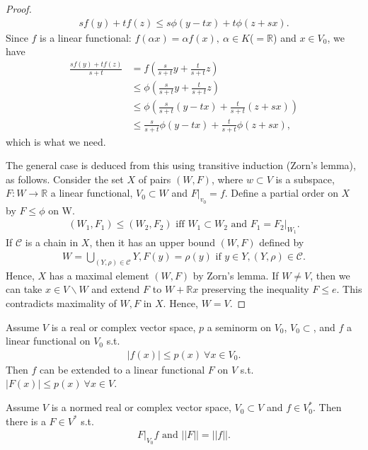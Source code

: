 \begin{proof}
\begin{align*}
    sf(y) + tf(z) \leq s\phi(y-tx) + t\phi(z+sx).
\end{align*}
Since \(f\) is a linear functional: \(f(\alpha x) = \alpha f(x), \ \alpha\in K\)(\(=\mathbb{R}\)) and \(x\in V_{0}\), we have
\begin{align*}
    \frac{sf(y) +tf(z)}{s+t} &= f\left(\frac{s}{s+t}y + \frac{t}{s+t}z\right) \\
    &\leq \phi\left(\frac{s}{s+t}y + \frac{t}{s+t}z\right) \\
    &\leq \phi\left(\frac{s}{s+t}(y-tx) + \frac{t}{s+t}(z+sx)\right) \\
    &\leq \frac{s}{s+t}\phi\left(y-tx\right) + \frac{t}{s+t}\phi\left(z+sx\right),
\end{align*}
which is what we need. 

The general case is deduced from this using transitive induction (Zorn's lemma), as follows. Consider the set \(X\) of pairs \((W,F)\), 
where \(w\subset V\) is a subspace, \(F:W\rightarrow \mathbb{R}\) a linear functional, \(V_0\subset W\) and \(F\vert_{v_0} = f\). Define
a partial order on \(X\) by \(F\leq \phi\) on W. 
\begin{align*}
    (W_1, F_1) \leq (W_2, F_2) \text{ iff } W_1\subset W_2\text{ and } F_1=F_2\vert_{W_1}.
\end{align*}
If \(\mathcal{C}\) is a chain in \(X\), then it has an upper bound \((W,F)\) defined by
\begin{align*}
    W = \bigcup\limits_{(Y,\rho)\in\mathcal{C}} Y, F(y) = \rho(y) \text{ if } y\in Y, (Y,\rho) \in\mathcal{C}.
\end{align*}
Hence, \(X\) has a maximal element \((W,F)\) by Zorn's lemma. If \(W\neq V\), then we can take \(x\in V\backslash W\) and extend \(F\) to
\(W+\mathbb{R}x\) preserving the inequality \(F\leq e\). This contradicts maximality of \(W,F\) in \(X\). Hence, \(W=V\).
\end{proof}
\fi 
\begin{theorem}
    Assume \(V\) is a real or complex vector space, \(p\) a seminorm on \(V_0\), \(V_0\subset\), and \(f\) a linear functional on \(V_0\) s.t.
    \begin{align*}
        |f(x)|\leq p(x) \ \forall x\in V_0.
    \end{align*}
    Then \(f\) can be extended to a linear functional \(F\) on \(V\) s.t. \(|F(x)|\leq p(x) \ \forall x\in V\).
\end{theorem}
\begin{corollary}
    Assume \(V\) is a normed real or complex vector space, \(V_0\subset V\) and \(f\in V_{0}^{*}\). Then there is a \(F\in V^*\) s.t. 
    \begin{align*}
        F\vert_{V_0} f \text{ and } ||F|| = ||f||.
    \end{align*}
\end{corollary}
